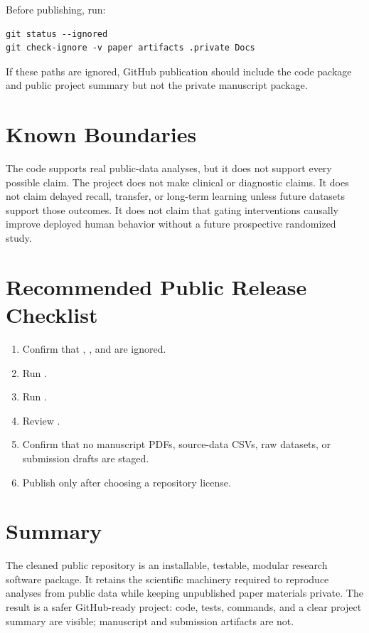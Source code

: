 \documentclass[11pt]{article}
\begin{document}
Before publishing, run:

\begin{verbatim}
git status --ignored
git check-ignore -v paper artifacts .private Docs
\end{verbatim}

If these paths are ignored, GitHub publication should include the code package and public project summary but not the private manuscript package.

\section*{Known Boundaries}

The code supports real public-data analyses, but it does not support every possible claim. The project does not make clinical or diagnostic claims. It does not claim delayed recall, transfer, or long-term learning unless future datasets support those outcomes. It does not claim that gating interventions causally improve deployed human behavior without a future prospective randomized study.

\section*{Recommended Public Release Checklist}

\begin{enumerate}[leftmargin=*]
  \item Confirm that , , and  are ignored.
  \item Run .
  \item Run .
  \item Review .
  \item Confirm that no manuscript PDFs, source-data CSVs, raw datasets, or submission drafts are staged.
  \item Publish only after choosing a repository license.
\end{enumerate}

\section*{Summary}

The cleaned public repository is an installable, testable, modular research software package. It retains the scientific machinery required to reproduce analyses from public data while keeping unpublished paper materials private. The result is a safer GitHub-ready project: code, tests, commands, and a clear project summary are visible; manuscript and submission artifacts are not.
\end{document}
